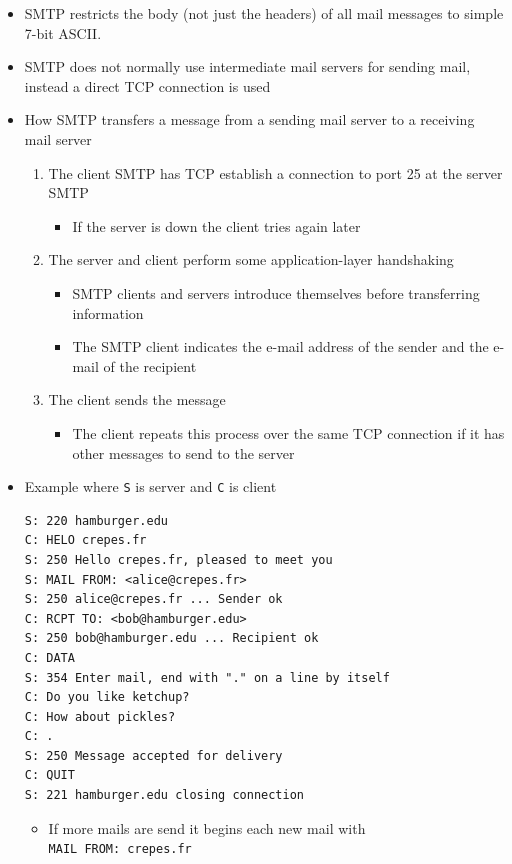\documentclass[11pt]{article}
\providecommand{\tightlist}{%
      \setlength{\itemsep}{0pt}\setlength{\parskip}{0pt}}
\begin{document}
\begin{itemize}
\item
  SMTP restricts the body (not just the headers) of all mail messages to
  simple 7-bit ASCII.
\item
  SMTP does not normally use intermediate mail servers for sending mail,
  instead a direct TCP connection is used
\item
  How SMTP transfers a message from a sending mail server to a receiving
  mail server

  \begin{enumerate}
  \def\labelenumi{\arabic{enumi}.}
  \tightlist
  \item
    The client SMTP has TCP establish a connection to port 25 at the
    server SMTP

    \begin{itemize}
    \tightlist
    \item
      If the server is down the client tries again later
    \end{itemize}
  \item
    The server and client perform some application-layer handshaking

    \begin{itemize}
    \tightlist
    \item
      SMTP clients and servers introduce themselves before transferring
      information
    \item
      The SMTP client indicates the e-mail address of the sender and the
      e-mail of the recipient
    \end{itemize}
  \item
    The client sends the message

    \begin{itemize}
    \tightlist
    \item
      The client repeats this process over the same TCP connection if it
      has other messages to send to the server
    \end{itemize}
  \end{enumerate}
\item
  Example where \texttt{S} is server and \texttt{C} is client

\begin{verbatim}
S: 220 hamburger.edu
C: HELO crepes.fr
S: 250 Hello crepes.fr, pleased to meet you
S: MAIL FROM: <alice@crepes.fr>
S: 250 alice@crepes.fr ... Sender ok
C: RCPT TO: <bob@hamburger.edu>
S: 250 bob@hamburger.edu ... Recipient ok
C: DATA
S: 354 Enter mail, end with "." on a line by itself
C: Do you like ketchup?
C: How about pickles?
C: .
S: 250 Message accepted for delivery
C: QUIT
S: 221 hamburger.edu closing connection
\end{verbatim}

  \begin{itemize}
  \tightlist
  \item
    If more mails are send it begins each new mail with
    \texttt{MAIL\ FROM:\ crepes.fr}
  \end{itemize}
\end{itemize}
\end{document}
